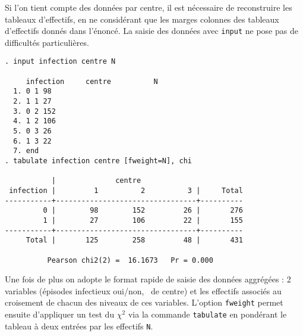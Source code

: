 Si l'on tient compte des données par centre, il est nécessaire de
reconstruire les tableaux d'effectifs, en ne considérant que les marges
colonnes des tableaux d'effectifs donnés dans l'énoncé. La saisie des
données avec \texttt{input} ne pose pas de difficultés particulières.
\begin{verbatim}
. input infection centre N

     infection     centre          N
  1. 0 1 98
  2. 1 1 27
  3. 0 2 152
  4. 1 2 106
  5. 0 3 26
  6. 1 3 22
  7. end
. tabulate infection centre [fweight=N], chi

           |              centre
 infection |         1          2          3 |     Total
-----------+---------------------------------+----------
         0 |        98        152         26 |       276 
         1 |        27        106         22 |       155 
-----------+---------------------------------+----------
     Total |       125        258         48 |       431 

          Pearson chi2(2) =  16.1673   Pr = 0.000
\end{verbatim}
Une fois de plus on adopte le format rapide de saisie des données aggrégées
: 2 variables (épisodes infectieux oui/non, \no\ de centre) et les effectifs
associés au croisement de chacun des niveaux de ces variables. L'option
\texttt{fweight} permet ensuite d'appliquer un test du $\chi^2$ via la
commande \texttt{tabulate} en pondérant le tableau à deux entrées par les
effectifs \texttt{N}. 


